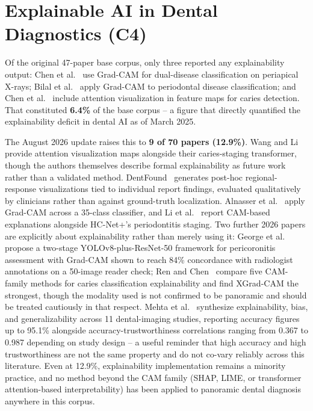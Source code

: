 \documentclass[conference]{IEEEtran}
\begin{document}
\section{Explainable AI in Dental Diagnostics (C4)}
\label{sec:xai}

Of the original 47-paper base corpus, only three reported any
explainability output: Chen et al.~\cite{chen2023deep} use Grad-CAM for
dual-disease classification on periapical X-rays; Bilal et
al.~\cite{bilal2024pdcnet} apply Grad-CAM to periodontal disease
classification; and Chen et al.~\cite{chen2024cariesxrays} include
attention visualization in feature maps for caries detection. That
constituted \textbf{6.4\%} of the base corpus -- a figure that directly
quantified the explainability deficit in dental AI as of March 2025.

The August 2026 update raises this to \textbf{9 of 70 papers
(12.9\%)}. Wang and Li~\cite{wang2026transformer} provide attention
visualization maps alongside their caries-staging transformer, though
the authors themselves describe formal explainability as future work
rather than a validated method. DentFound~\cite{zhu2026dentfound}
generates post-hoc regional-response visualizations tied to individual
report findings, evaluated qualitatively by clinicians rather than
against ground-truth localization. Alnasser et
al.~\cite{alnasser2026advanced} apply Grad-CAM across a 35-class
classifier, and Li et al.~\cite{li2025novel} report CAM-based
explanations alongside HC-Net+'s periodontitis staging. Two further
2026 papers are explicitly about explainability rather than merely
using it: George et al.~\cite{george2026explainable} propose a
two-stage YOLOv8-plus-ResNet-50 framework for pericoronitis assessment
with Grad-CAM shown to reach 84\% concordance with radiologist
annotations on a 50-image reader check; Ren and
Chen~\cite{ren2026dualbranch} compare five CAM-family methods for
caries classification explainability and find XGrad-CAM the strongest,
though the modality used is not confirmed to be panoramic and should
be treated cautiously in that respect. Mehta et
al.~\cite{mehta2026explainability} synthesize explainability, bias, and
generalizability across 11 dental-imaging studies, reporting accuracy
figures up to 95.1\% alongside accuracy-trustworthiness correlations
ranging from 0.367 to 0.987 depending on study design -- a useful
reminder that high accuracy and high trustworthiness are not the same
property and do not co-vary reliably across this literature. Even at
12.9\%, explainability implementation remains a minority practice, and
no method beyond the CAM family (SHAP, LIME, or transformer
attention-based interpretability) has been applied to panoramic dental
diagnosis anywhere in this corpus.
\end{document}
